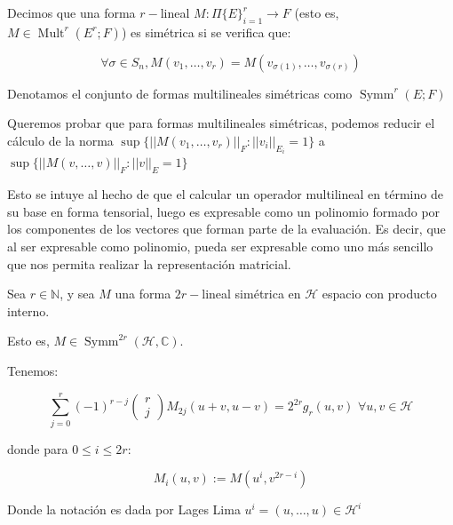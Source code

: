 \begin{defn}
	Decimos que una forma $r-$lineal $M:\Pi \{E\}_{i = 1}^r \to F$ (esto es, $M \in \operatorname{Mult}^r(E^r;F)$) es simétrica si se verifica que:
	
	\begin{equation*}
		\forall \sigma \in S_n, M(v_1,\dots, v_r) = M(v_{\sigma(1)},\dots, v_{\sigma(r)}) 
	\end{equation*}
	
	Denotamos el conjunto de formas multilineales simétricas como $\operatorname{Symm}^r(E;F)$
\end{defn}

\begin{rmrk}
	Queremos probar que para formas multilineales simétricas, podemos reducir el cálculo de la norma $\sup \{||M(v_1,\dots,v_r)||_F : ||v_i||_{E_i} = 1 \}$ a $\sup \{||M(v,\dots,v)||_F : ||v||_{E} = 1 \}$
	
	Esto se intuye al hecho de que el calcular un operador multilineal en término de su base en forma tensorial, luego es expresable como un polinomio formado por los componentes de los vectores que forman parte de la evaluación. Es decir, que al ser expresable como polinomio, pueda ser expresable como uno más sencillo que nos permita realizar la representación matricial.
\end{rmrk}

\begin{lem}[Polarización]
	Sea $r \in \mathbb{N    }$, y sea $M$ una forma $2r-$lineal simétrica en $\mathcal{H}$ espacio con producto interno.
	
	Esto es, $M\in \operatorname{Symm}^{2r}(\mathcal{H}, \mathbb{C})$. 
	
	Tenemos:
	
	\begin{equation*}
		\sum_{j = 0}^r (-1)^{r-j} \begin{pmatrix}
			r\\
			j
		\end{pmatrix} M_{2j}(u+v,u-v) = 2^{2r}g_r(u,v) \,\, \forall u,v \in \mathcal{H}
	\end{equation*}
	
	donde para $0\leq i \leq 2r$:
	
	\begin{equation*}
		M_i(u,v) := M(u^i,v^{2r-i})
	\end{equation*}
	
	Donde la notación es dada por Lages Lima $u^i = (u,\dots,u)\in \mathcal{H}^i$
\end{lem}


